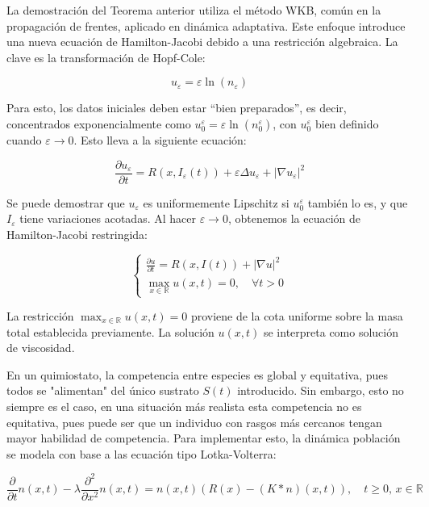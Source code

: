 La demostración del Teorema anterior utiliza el método WKB, común en la propagación de frentes, aplicado en dinámica adaptativa. Este enfoque introduce una nueva ecuación de Hamilton-Jacobi debido a una restricción algebraica. La clave es la transformación de Hopf-Cole:

\begin{equation}
	u_\varepsilon = \varepsilon \ln(n_\varepsilon)
\end{equation}


Para esto, los datos iniciales deben estar ``bien preparados'', es decir, concentrados exponencialmente como \( u_0^\varepsilon = \varepsilon \ln(n_0^\varepsilon) \), con \( u_0^\varepsilon \) bien definido cuando \( \varepsilon \to 0 \). Esto lleva a la siguiente ecuación:

\begin{equation*}
	\frac{\partial u_\varepsilon}{\partial t} = R(x, I_\varepsilon(t)) +   \varepsilon \Delta u_\varepsilon + |\nabla u_\varepsilon|^2
\end{equation*}

Se puede demostrar que \( u_\varepsilon \) es uniformemente Lipschitz si \( u_0^\varepsilon \) también lo es, y que \( I_\varepsilon \) tiene variaciones acotadas. Al hacer \( \varepsilon \to 0 \), obtenemos la ecuación de Hamilton-Jacobi restringida:


\begin{equation*}
	\begin{cases}
		\frac{\partial u}{\partial t} = R(x, I(t)) + |\nabla u|^2 \\
		\max_{x \in \mathbb{R}} u(x, t) = 0, \quad \forall t > 0
	\end{cases}
\end{equation*}


La restricción \( \max_{x \in \mathbb{R}} u(x, t) = 0 \) proviene de la cota uniforme sobre la masa total establecida previamente. La solución \( u(x,t) \) se interpreta como solución de viscosidad.

\citep{Mirrahimi2011}En un quimiostato, la competencia entre especies es global y equitativa, pues todos se "alimentan" del único sustrato $S(t)$ introducido. Sin embargo, esto no siempre es el caso, en una situación más realista esta competencia no es equitativa, pues puede ser que un individuo con rasgos más cercanos tengan mayor habilidad de competencia. Para implementar esto, la dinámica población se modela con base a las ecuación tipo Lotka-Volterra:

\begin{equation*}
	\frac{\partial}{\partial t} n(x,t) - \lambda \frac{\partial^2}{\partial x^2} n(x,t) = n(x,t) \left( R(x) - (K * n)(x,t) \right), \quad t \geq 0, \, x \in \mathbb{R}
\end{equation*}

